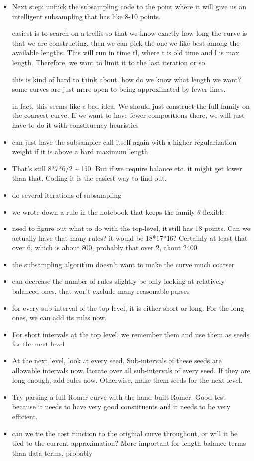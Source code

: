 \documentclass{book}
\begin{document}
\begin{itemize}
\item Next step: unfuck the subsampling code to the point where it will
    give us an intelligent subsampling that has like 8-10 points.

    easiest is to search on a trellis so that we know exactly how long
    the curve is that we are constructing. then we can pick the one we
    like best among the available lengths. This will run in time tl,
    where t is old time and l is max length. Therefore, we want to
    limit it to the last iteration or so.

    this is kind of hard to think about. how do we know what length we
    want? some curves are just more open to being approximated by
    fewer lines.

    in fact, this seems like a bad idea. We should just construct the
    full family on the coarsest curve. If we want to have fewer
    compositions there, we will just have to do it with constituency
    heuristics
\item can just have the subsampler call itself again with a higher
    regularization weight if it is above a hard maximum length
\item That's still 8*7*6/2 \~{} 160. But if we require balance etc. it
    might get lower than that. Coding it is the easiest way to find out.
\item do several iterations of subsampling
\item we wrote down a rule in the notebook that keeps the family
    $\theta$-flexible
\item need to figure out what to do with the top-level, it still has 18
    points. Can we actually have that many rules? it would be
    18*17*16? Certainly at least that over 6, which is about 800,
    probably that over 2, about 2400
\item the subsampling algorithm doesn't want to make the curve much coarser
\end{itemize}
\begin{itemize}
\item can decrease the number of rules slightly be only looking at
    relatively balanced ones, that won't exclude many reasonable
    parses
\item for every sub-interval of the top-level, it is either short or
    long. For the long ones, we can add its rules now.
\item For short intervals at the top level, we remember them and use
    them as seeds for the next level
\item At the next level, look at every seed. Sub-intervals of these
    seeds are allowable intervals now. Iterate over all sub-intervals
    of every seed. If they are long enough, add rules now. Otherwise,
    make them seeds for the next level.
\item Try parsing a full Romer curve with the hand-built Romer. Good
    test because it needs to have very good constituents and it needs
    to be very efficient.
\item can we tie the cost function to the original curve throughout, or
    will it be tied to the current approximation? More important for
    length balance terms than data terms, probably
\end{itemize}
\end{document}
